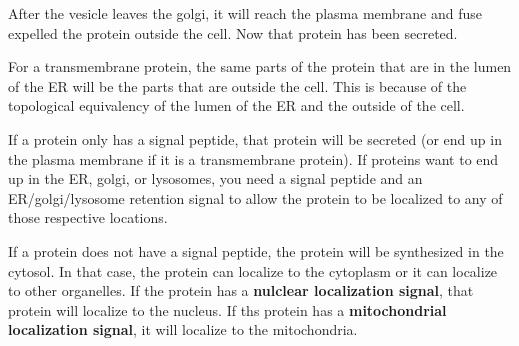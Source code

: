 \documentclass{article}
\begin{document}
After the vesicle leaves the golgi, it will reach the plasma membrane and fuse
expelled the protein outside the cell. Now that protein has been secreted. 

For a transmembrane protein, the same parts of the protein that are in the lumen
of the ER will be the parts that are outside the cell. This is because of the
topological equivalency of the lumen of the ER and the outside of the cell.

If a protein only has a signal peptide, that protein will be secreted (or end up
in the plasma membrane if it is a transmembrane protein). If proteins want to end
up in the ER, golgi, or lysosomes, you need a signal peptide and an
ER/golgi/lysosome retention signal to allow the protein to be localized to any
of those respective locations.

If a protein does not have a signal peptide, the protein will be synthesized in
the cytosol. In that case, the protein can localize to the cytoplasm or it can
localize to other organelles. If the protein has a \textbf{nulclear localization
signal}, that protein will localize to the nucleus. If ths protein has a
\textbf{mitochondrial localization signal}, it will localize to the
mitochondria.
\end{document}
